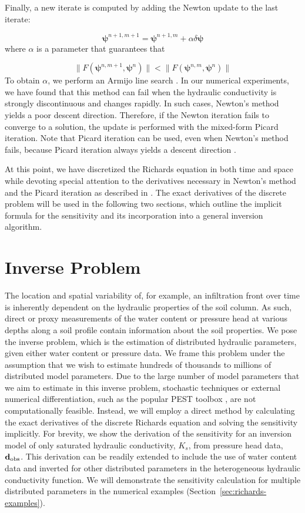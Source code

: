 \documentclass[preprint,review,3p,times,onecolumn,authoryear]{elsarticle}
\newcommand{\bfpsi}{\boldsymbol{\psi}}
\newcommand{\nnm}{^{n+1,m}}
\newcommand{\nnmm}{^{n+1,m+1}}
\newcommand{\n}{^{n}}
\newcommand{\bfdo}{\mathbf{d}_{\rm obs}}
\newcommand{\FF}{F}
\begin{document}
Finally, a new iterate is computed by adding the Newton update to the last iterate:

$$\bfpsi\nnmm = \bfpsi\nnm+ \alpha \delta \bfpsi$$
where $\alpha$ is a parameter that guarantees that

$$ \|\FF(\bfpsi^{n,m+1},\bfpsi\n) \| < \| \FF(\bfpsi^{n,m},\bfpsi\n) \| $$
To obtain $\alpha$, we perform an Armijo line search \citep{nw}. In our numerical experiments, we have found that this method can fail when the hydraulic conductivity is strongly discontinuous and changes rapidly. In such cases, Newton's method yields a poor descent direction. Therefore, if the Newton iteration fails to converge to a solution, the update is performed with the mixed-form Picard iteration. Note that Picard iteration can be used, even when Newton’s method fails, because Picard iteration always yields a descent direction \citep{vogelBook}.

At this point, we have discretized the Richards equation in both time and space while devoting special attention to the derivatives necessary in Newton's method and the Picard iteration as described in \cite{Celia1990}. The exact derivatives of the discrete problem will be used in the following two sections, which outline the implicit formula for the sensitivity and its incorporation into a general inversion algorithm.
\section{Inverse Problem}
\label{sec:richards-inverse}

The location and spatial variability of, for example, an infiltration front over time is inherently dependent on the hydraulic properties of the soil column. As such, direct or proxy measurements of the water content or pressure head at various depths along a soil profile contain information about the soil properties. We pose the inverse problem, which is the estimation of distributed hydraulic parameters, given either water content or pressure data. We frame this problem under the assumption that we wish to estimate hundreds of thousands to millions of distributed model parameters. Due to the large number of model parameters that we aim to estimate in this inverse problem, stochastic techniques or external numerical differentiation, such as the popular PEST toolbox \citep{Doherty2015}, are not computationally feasible. Instead, we will employ a direct method by calculating the exact derivatives of the discrete Richards equation and solving the sensitivity implicitly. For brevity, we show the derivation of the sensitivity for an inversion model of only saturated hydraulic conductivity, $K_s$, from pressure head data, $\bfdo$. This derivation can be readily extended to include the use of water content data and inverted for other distributed parameters in the heterogeneous hydraulic conductivity function. We will demonstrate the sensitivity calculation for multiple distributed parameters in the numerical examples (Section~\ref{sec:richards-examples}).
\end{document}
